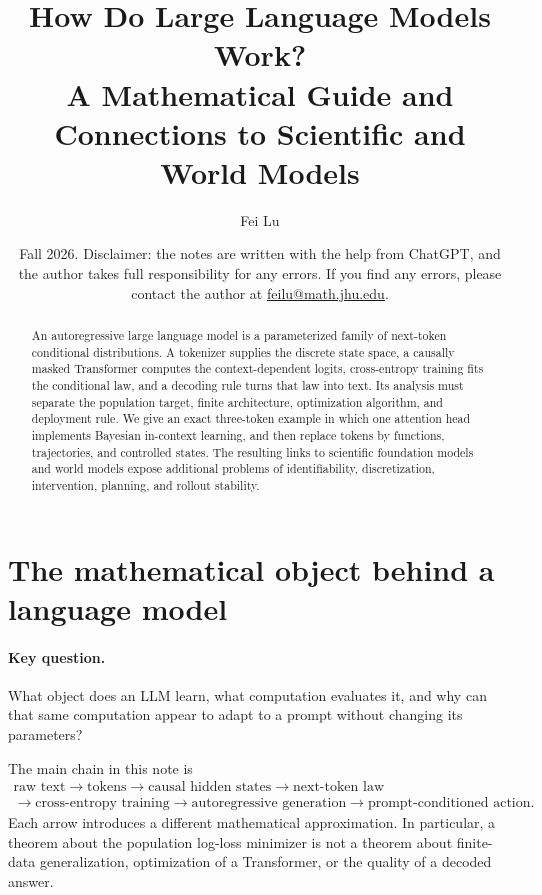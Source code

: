 \documentclass[11pt]{amsart}
\title[How Do Large Language Models Work?]
{How Do Large Language Models Work?\\
A Mathematical Guide and Connections to Scientific and World Models}
\author{Fei Lu}
\date{Fall 2026. Disclaimer: the notes are written with the help from ChatGPT,
and the author takes full responsibility for any errors. If you find any
errors, please contact the author at
\href{mailto:feilu@math.jhu.edu}{feilu@math.jhu.edu}.}
\numberwithin{equation}{section}
\theoremstyle{definition}
\theoremstyle{plain}
\theoremstyle{remark}
\begin{document}
\begin{abstract}
An autoregressive large language model is a parameterized family of
next-token conditional distributions.  A tokenizer supplies the discrete
state space, a causally masked Transformer computes the context-dependent
logits, cross-entropy training fits the conditional law, and a decoding rule
turns that law into text.  Its analysis must separate the population target,
finite architecture, optimization algorithm, and deployment rule.  We give an exact
three-token example in which one attention head implements Bayesian
in-context learning, and then replace tokens by functions, trajectories, and
controlled states.  The resulting links to scientific foundation models and
world models expose additional problems of identifiability, discretization,
intervention, planning, and rollout stability.
\end{abstract}

\maketitle

\section{The mathematical object behind a language model}
\label{sec:language-law}

\paragraph{\textbf{Key question.}}
What object does an LLM learn, what computation evaluates it, and why can that
same computation appear to adapt to a prompt without changing its parameters?

The main chain in this note is
\begin{equation}\label{eq:main-chain}
\begin{gathered}
\text{raw text}
\longrightarrow \text{tokens}
\longrightarrow \text{causal hidden states}
\longrightarrow \text{next-token law}\\
\longrightarrow \text{cross-entropy training}
\longrightarrow \text{autoregressive generation}
\longrightarrow \text{prompt-conditioned action}.
\end{gathered}
\end{equation}
Each arrow introduces a different mathematical approximation.  In particular,
a theorem about the population log-loss minimizer is not a theorem about
finite-data generalization, optimization of a Transformer, or the quality of a
decoded answer.
\end{document}
